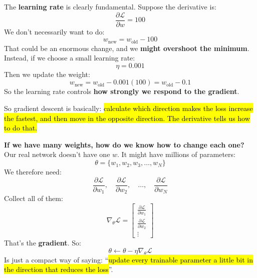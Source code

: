 \begin{remarkbox}
    The \textbf{learning rate} is clearly fundamental. Suppose the derivative is:
    \begin{equation*}
        \frac{\partial\mathcal{L}}{\partial w} = 100
    \end{equation*}
    We don't necessarily want to do:
    \begin{equation*}
        w_{\text{new}} = w_{\text{old}} - 100
    \end{equation*}
    That could be an enormous change, and we \textbf{might overshoot the minimum}. Instead, if we choose a small learning rate:
    \begin{equation*}
        \eta = 0.001
    \end{equation*}
    Then we update the weight:
    \begin{equation*}
        w_{\text{new}} = w_{\text{old}} - 0.001(100) = w_{\text{old}} - 0.1
    \end{equation*}
    So the learning rate controls \textbf{how strongly we respond to the gradient}.

    \highspace
    So gradient descent is basically: \hl{calculate which direction makes the loss increase the fastest, and then move in the opposite direction. The derivative tells us how to do that.}

    \highspace
    \textcolor{Green3}{ \textbf{If we have many weights, how do we know how to change each one?}} Our real network doesn't have one $w$. It might have millions of parameters:
    \begin{equation*}
        \theta=
        \{w_1,w_2,w_3,\ldots,w_N\}
    \end{equation*}
    We therefore need:
    \begin{equation*}
        \frac{\partial\mathcal{L}}{\partial w_1},
        \quad
        \frac{\partial\mathcal{L}}{\partial w_2},
        \quad
        \ldots,
        \quad
        \frac{\partial\mathcal{L}}{\partial w_N}
    \end{equation*}
    Collect all of them:
    \begin{equation*}
        \nabla_{\theta} \mathcal{L}
        =
        \begin{bmatrix}
            \frac{\partial\mathcal{L}}{\partial w_1}\\[.5em]
            \frac{\partial\mathcal{L}}{\partial w_2}\\
            \vdots
        \end{bmatrix}
    \end{equation*}
    That's the \textbf{gradient}. So:
    \begin{equation*}
        \theta
        \leftarrow
        \theta-\eta\nabla_{\theta}\mathcal{L}
    \end{equation*}
    Is just a compact way of saying: ``\hl{update every trainable parameter a little bit in the direction that reduces the loss}''.


\end{remarkbox}
